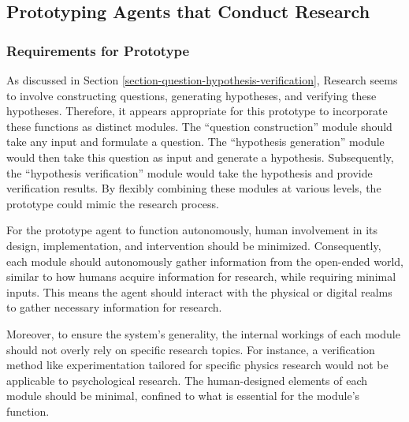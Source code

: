 
\subsection{Prototyping Agents that Conduct Research}

\subsubsection{Requirements for Prototype}
As discussed in Section \ref{section-question-hypothesis-verification}, Research seems to involve constructing questions, generating hypotheses, and verifying these hypotheses. Therefore, it appears appropriate for this prototype to incorporate these functions as distinct modules. The ``question construction'' module should take any input and formulate a question. The ``hypothesis generation'' module would then take this question as input and generate a hypothesis. Subsequently, the ``hypothesis verification'' module would take the hypothesis and provide verification results. By flexibly combining these modules at various levels, the prototype could mimic the research process.

For the prototype agent to function autonomously, human involvement in its design, implementation, and intervention should be minimized. Consequently, each module should autonomously gather information from the open-ended world, similar to how humans acquire information for research, while requiring minimal inputs. This means the agent should interact with the physical or digital realms to gather necessary information for research.

Moreover, to ensure the system's generality, the internal workings of each module should not overly rely on specific research topics. For instance, a verification method like experimentation tailored for specific physics research would not be applicable to psychological research. The human-designed elements of each module should be minimal, confined to what is essential for the module's function.

